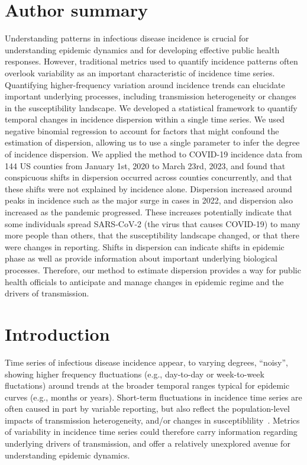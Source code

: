 \documentclass[10pt,letterpaper]{article}
\begin{document}
\section*{Author summary}
Understanding patterns in infectious disease incidence is crucial for understanding epidemic dynamics and for developing effective public health responses. 
However, traditional metrics used to quantify incidence patterns often overlook variability as an important characteristic of incidence time series. 
Quantifying higher-frequency variation around incidence trends can elucidate important underlying processes, including transmission heterogeneity or changes in the susceptibility landscape.
We developed a statistical framework to quantify temporal changes in incidence dispersion within a single time series. 
We used negative binomial regression to account for factors that might confound the estimation of dispersion, allowing us to use a single parameter to infer the degree of incidence dispersion. 
We applied the method to COVID-19 incidence data from 144 US counties from January 1st, 2020 to March 23rd, 2023, and found that conspicuous shifts in dispersion occurred across counties concurrently, and that these shifts were not explained by incidence alone. 
Dispersion increased around peaks in incidence such as the major surge in cases in 2022, and dispersion also increased as the pandemic progressed. 
These increases potentially indicate that some individuals spread SARS-CoV-2 (the virus that causes COVID-19) to many more people than others, that the susceptibility landscape changed, or that there were changes in reporting.
Shifts in dispersion can indicate shifts in epidemic phase as well as provide information about important underlying biological processes. 
Therefore, our method to estimate dispersion provides a way for public health officials to anticipate and manage changes in epidemic regime and the drivers of transmission. 

\linenumbers

\section*{Introduction}
Time series of infectious disease incidence appear, to varying degrees, ``noisy'', showing higher frequency fluctuations (e.g., day-to-day or week-to-week fluctations) around trends at the broader temporal ranges typical for epidemic curves (e.g., months or years).
Short-term fluctuations in incidence time series are often caused in part by variable reporting, but also reflect the population-level impacts of transmission heterogeneity, and/or changes in susceptiblility~\cite{lloyd-smith_superspreading_2005, kirkegaard_superspreading_2021, sun_transmission_2021,guo2023statistical,ko2023time}.
Metrics of variability in incidence time series could therefore carry information regarding underlying drivers of transmission, and offer a relatively unexplored avenue for understanding epidemic dynamics. 
\end{document}
